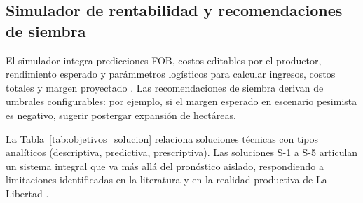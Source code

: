 

\subsection{Simulador de rentabilidad y recomendaciones de siembra}

El simulador integra predicciones FOB, costos editables por el productor, rendimiento esperado y par\'ammetros log\'isticos para calcular ingresos, costos totales y margen proyectado \citep{Capunay2025}. Las recomendaciones de siembra derivan de umbrales configurables: por ejemplo, si el margen esperado en escenario pesimista es negativo, sugerir postergar expansi\'on de hect\'areas.

La Tabla~\ref{tab:objetivos_solucion} relaciona soluciones t\'ecnicas con tipos anal\'iticos (descriptiva, predictiva, prescriptiva). Las soluciones S-1 a S-5 articulan un sistema integral que va m\'as all\'a del pron\'ostico aislado, respondiendo a limitaciones identificadas en la literatura y en la realidad productiva de La Libertad \citep{VargasCordova2025, Theofilou2025}.


